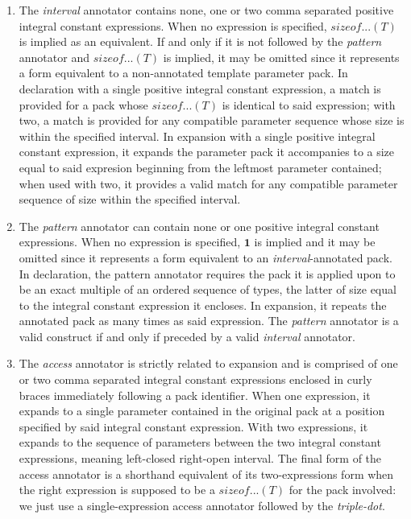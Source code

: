 \begin{enumerate}
\item\p The \textit{interval} annotator contains none, one or two comma separated positive integral constant expressions.
When no expression is specified, $sizeof...(T)$ is implied as an equivalent.
If and only if it is not followed by the \textit{pattern} annotator and $sizeof...(T)$ is implied, it may be omitted since it represents a form equivalent to a non-annotated template parameter pack.
In declaration with a single positive integral constant expression, a match is provided for a pack whose $sizeof...(T)$ is identical to said expression; with two, a match is provided for any compatible parameter sequence whose size is within the specified interval.
In expansion with a single positive integral constant expression, it expands the parameter pack it accompanies to a size equal to said expresion beginning from the leftmost parameter contained;
when used with two, it provides a valid match for any compatible parameter sequence of size within the specified interval.

\item\p The \textit{pattern} annotator can contain none or one positive integral constant expressions.
When no expression is specified, $\bm{1}$ is implied and it may be omitted since it represents a form equivalent to an \textit{interval}-annotated pack.
In declaration, the pattern annotator requires the pack it is applied upon to be an exact multiple of an ordered sequence of types, the latter of size equal to the integral constant expression it encloses. In expansion, it repeats the annotated pack as many times as said expression.
The \textit{pattern} annotator is a valid construct if and only if preceded by a valid \textit{interval} annotator.

\item\p The \textit{access} annotator is strictly related to expansion and is comprised of one or two comma separated integral constant expressions enclosed in curly braces immediately following a pack identifier.
When one expression, it expands to a single parameter contained in the original pack at a position specified by said integral constant expression.
With two expressions, it expands to the sequence of parameters between the two integral constant expressions, meaning left-closed right-open interval.
The final form of the access annotator is a shorthand equivalent of its two-expressions form when the right expression is supposed to be a $sizeof...(T)$ for the pack involved: we just use a single-expression access annotator followed by the \textit{triple-dot}.
\end{enumerate}

